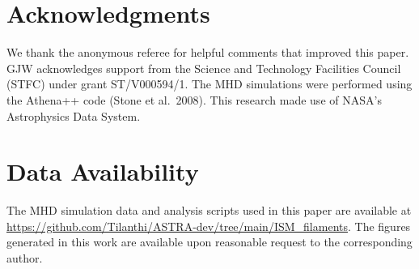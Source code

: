 \documentclass{mnras}
\begin{document}
\section*{Acknowledgments}

We thank the anonymous referee for helpful comments that improved this paper. GJW acknowledges support from the Science and Technology Facilities Council (STFC) under grant ST/V000594/1. The MHD simulations were performed using the Athena++ code (Stone et al.~2008). This research made use of NASA's Astrophysics Data System.


\section*{Data Availability}

The MHD simulation data and analysis scripts used in this paper are available at \url{https://github.com/Tilanthi/ASTRA-dev/tree/main/ISM_filaments}. The figures generated in this work are available upon reasonable request to the corresponding author.




\end{document}
